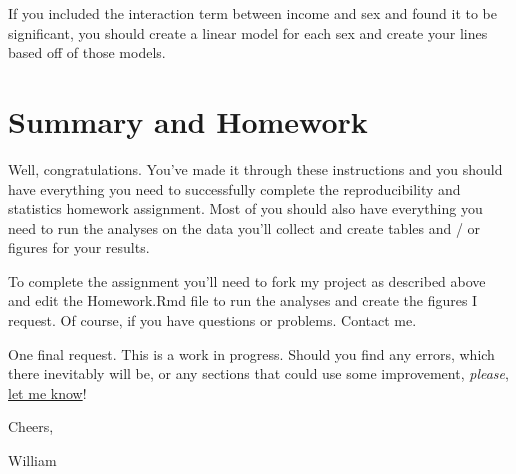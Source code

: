 \documentclass[12pt]{article}
\begin{document}
If you included the interaction term between income and sex and found it to
be significant, you should create a linear model for each sex and create
your lines based off of those models.

\section{Summary and Homework}
Well, congratulations. You've made it through these instructions and you should
have everything you need to successfully complete the reproducibility and
statistics homework assignment. Most of you should also have everything you
need to run the analyses on the data you'll collect and create tables and / or
figures for your results.

To complete the assignment you'll need to fork my project as described above
and edit the Homework.Rmd file to run the analyses and create the figures I
request. Of course, if you have questions or problems. Contact me.

One final request. This is a work in progress. Should you find any errors,
which there inevitably will be, or any sections that could use some
improvement, \emph{please}, \href{http://wknapp.com/mailform}{let me know}!

\hfill \break
Cheers,

\hfill \break
William
\end{document}
